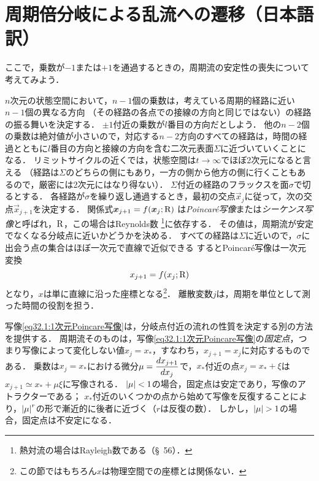 \section{\spade 周期倍分岐による乱流への遷移（日本語訳）}

ここで，乗数が$-1$または$+1$を通過するときの，周期流の安定性の喪失について考えてみよう．



$n$次元の状態空間において，$n-1$個の乗数は，考えている周期的経路に近い$n-1$個の異なる方向
（その経路の各点での接線の方向と同じではない）の経路の振る舞いを決定する．
$\pm 1$付近の乗数が$l$番目の方向だとしよう．
他の$n-2$個の乗数は絶対値が小さいので，対応する$n-2$方向のすべての経路は，時間の経過とともに$l$番目の方向と接線の方向を含む二次元表面$\Sigma$に近づいていくことになる．
リミットサイクルの近くでは，状態空間は$t\to\infty$でほぼ2次元になると言える
（経路は$\Sigma$のどちらの側にもあり，一方の側から他方の側に行くこともあるので，厳密には2次元にはなり得ない）．
$\Sigma$付近の経路のフラックスを面$\sigma$で切るとする．
各経路が$\sigma$を繰り返し通過するとき，最初の交点$\vec{x}_j$に従って，次の交点$\vec{x}_{j+1}$を決定する．
関係式$\vb*{x}_{j+1}=f(\vb*{x}_j ;\mathrm{R})$
は\emph{Poincar\'{e}写像}または\emph{シーケンス写像}と呼ばれ，$\mathrm{R}$，この場合はReynolds数
\footnote{熱対流の場合はRayleigh数である（\S~56）．}に依存する．
その値は，周期流が安定でなくなる分岐点に近いかどうかを決める．
すべての経路は$\Sigma$に近いので，$\sigma$に出会う点の集合はほぼ一次元で直線で近似できる
するとPoincar\'{e}写像は一次元変換
\begin{equation}\label{eq32.1:1次元Poincare写像}
    x_{j+1}=f(x_j ;\mathrm{R})
\end{equation}
となり，$x$は単に直線に沿った座標となる\footnote{この節ではもちろん$x$は物理空間での座標とは関係ない．}．
離散変数$j$は，周期を単位として測った時間の役割を担う．




写像\eqref{eq32.1:1次元Poincare写像}は，分岐点付近の流れの性質を決定する別の方法を提供する．
周期流そのものは，写像\eqref{eq32.1:1次元Poincare写像}の\emph{固定点}，つまり写像によって変化しない値$x_j=x_*$，すなわち，$x_{j+1}=x_j$に対応するものである．
乗数は$x_j=x_*$における微分$\mu=\ddv{x_{j+1}}{x_j}$で，$x_*$付近の点$x_j=x_*+\xi$は$x_{j+1}\simeq x_* + \mu\xi$に写像される．
$\abs{\mu}<1$の場合，固定点は安定であり，写像のアトラクターである；
$x_*$付近のいくつかの点から始めて写像を反復することにより，$\abs{\mu}^r$の形で漸近的に後者に近づく（$r$は反復の数）．
しかし，$\abs{\mu}>1$の場合，固定点は不安定になる．




